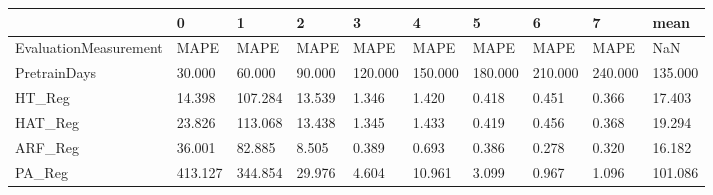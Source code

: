 \begin{tabular}{llllllllll}
\toprule
{} &       0 &       1 &      2 &       3 &       4 &       5 &       6 &       7 &    mean \\
\midrule
EvaluationMeasurement &    MAPE &    MAPE &   MAPE &    MAPE &    MAPE &    MAPE &    MAPE &    MAPE &     NaN \\
PretrainDays          &  30.000 &  60.000 & 90.000 & 120.000 & 150.000 & 180.000 & 210.000 & 240.000 & 135.000 \\
HT\_Reg                &  14.398 & 107.284 & 13.539 &   1.346 &   1.420 &   0.418 &   0.451 &   0.366 &  17.403 \\
HAT\_Reg               &  23.826 & 113.068 & 13.438 &   1.345 &   1.433 &   0.419 &   0.456 &   0.368 &  19.294 \\
ARF\_Reg               &  36.001 &  82.885 &  8.505 &   0.389 &   0.693 &   0.386 &   0.278 &   0.320 &  16.182 \\
PA\_Reg                & 413.127 & 344.854 & 29.976 &   4.604 &  10.961 &   3.099 &   0.967 &   1.096 & 101.086 \\
\bottomrule
\end{tabular}
